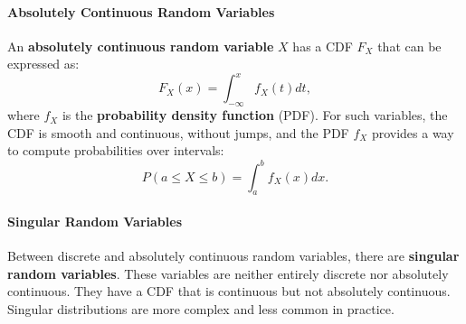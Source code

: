     \paragraph{Absolutely Continuous Random Variables}
    
    An \textbf{absolutely continuous random variable} \( X \) has a CDF \( F_X \) that can be expressed as:
    \[
    F_X(x) = \int_{-\infty}^{x} f_X(t) dt,
    \]
    where \( f_X \) is the \textbf{probability density function} (PDF). For such variables, the CDF is smooth and continuous, without jumps, and the PDF \( f_X \) provides a way to compute probabilities over intervals:
    \[
    P(a \leq X \leq b) = \int_{a}^{b} f_X(x) dx.
    \]
    
    \paragraph{Singular Random Variables}
    
    Between discrete and absolutely continuous random variables, there are \textbf{singular random variables}. These variables are neither entirely discrete nor absolutely continuous. They have a CDF that is continuous but not absolutely continuous. Singular distributions are more complex and less common in practice.
    